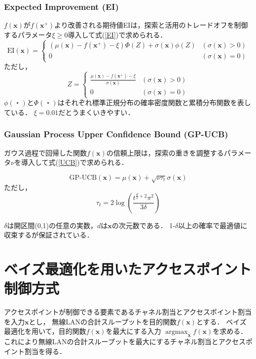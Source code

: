 \documentclass[a4paper,11pt]{jarticle}
\DeclareMathOperator*{\argmax}{argmax}
\begin{document}
\subsubsection{Expected Improvement (EI)}
$f(\mathbf{x})$が$f(\mathbf{x}^+)$より改善される期待値EIは，探索と活用のトレードオフを制御するパラメータ$\xi\geq0$導入して式(\ref{EI})で求められる．
\begin{equation}
  \text{EI}(\mathbf{x}) = \left \{
  \begin{array}{ll}
    (\mu(\mathbf{x})-f(\mathbf{x}^+)-\xi)\Phi(Z) + \sigma(\mathbf{x})\phi(Z) & (\sigma(\mathbf{x}) > 0) \\
    0 & (\sigma(\mathbf{x}) = 0) \label{EI}
  \end{array}
  \right.
\end{equation}
ただし，
$$
  Z = \left \{
  \begin{array}{ll}
    \frac{\mu(\mathbf{x})-f(\mathbf{x}^+)-\xi}{\sigma(\mathbf{x})} & (\sigma(\mathbf{x}) > 0) \\
    0 & (\sigma(\mathbf{x}) = 0)
  \end{array}
  \right.
$$
$\phi(・)$と$\Phi(・)$はそれぞれ標準正規分布の確率密度関数と累積分布関数を表している．
$\xi=0.01$だとうまくいきやすい\cite{Lizotte:2008:PBO:1626686}．

\subsubsection{Gaussian Process Upper Confidence Bound (GP-UCB)}
ガウス過程で回帰した関数$f(\mathbf{x})$の信頼上限は，探索の重きを調整するパラメータ$\nu$を導入して式(\ref{UCB})で求められる．

\begin{equation}
  \text{GP-UCB}(\mathbf{x})=\mu(\mathbf{x})+\sqrt{\nu\tau_t}\sigma(\mathbf{x}) \label{UCB}
\end{equation}
ただし，
$$\tau_t=2\log\left(\frac{t^{\frac{d}{2}+2}\pi^2}{3\delta}\right)$$

$\delta$は開区間(0,1)の任意の実数，$d$は$\mathbf{x}$の次元数である．
1-$\delta$以上の確率で最適値に収束するが保証されている\cite{Srinivas}．

\section{ベイズ最適化を用いたアクセスポイント制御方式}
アクセスポイントが制御できる要素であるチャネル割当とアクセスポイント割当を入力$\mathbf{x}$とし，
無線LANの合計スループットを目的関数$f(\mathbf{x})$とする．
ベイズ最適化を用いて，目的関数$f(\mathbf{x})$を最大にする入力
$\argmax_{\mathbf{x}} f(\mathbf{x})$を求める．
これにより無線LANの合計スループットを最大にするチャネル割当とアクセスポイント割当を得る．
\end{document}
